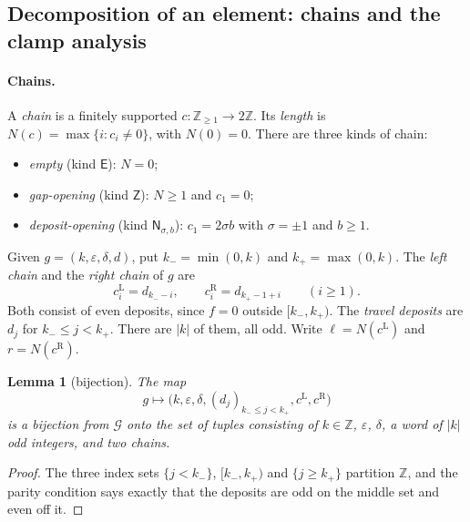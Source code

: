 \documentclass[11pt]{article}
\theoremstyle{plain}
\newtheorem{lemma}[theorem]{Lemma}
\theoremstyle{definition}
\theoremstyle{remark}
\begin{document}
\subsection{Decomposition of an element: chains and the clamp analysis}\label{app:decomp}

\paragraph{Chains.}
A \emph{chain} is a finitely supported $c:\mathbb Z_{\ge1}\to2\mathbb Z$. Its \emph{length}
is $N(c)=\max\{i:c_i\ne0\}$, with $N(0)=0$. There are three kinds of chain:
\begin{itemize}
\item \emph{empty} (kind $\mathsf E$): $N=0$;
\item \emph{gap-opening} (kind $\mathsf Z$): $N\ge1$ and $c_1=0$;
\item \emph{deposit-opening} (kind $\mathsf N_{\sigma,b}$): $c_1=2\sigma b$ with $\sigma=\pm1$ and $b\ge1$.
\end{itemize}

Given $g=(k,\varepsilon,\delta,d)$, put $k_-=\min(0,k)$ and $k_+=\max(0,k)$. The
\emph{left chain} and the \emph{right chain} of $g$ are
\[
  c^{\mathrm L}_i=d_{k_--i},\qquad c^{\mathrm R}_i=d_{k_+-1+i}\qquad(i\ge1).
\]
Both consist of even deposits, since $f=0$ outside $[k_-,k_+)$. The \emph{travel deposits}
are $d_j$ for $k_-\le j<k_+$. There are $|k|$ of them, all odd. Write $\ell=N(c^{\mathrm L})$
and $r=N(c^{\mathrm R})$.

\begin{lemma}[bijection]\label{M3:lem:bij}
The map
\[
  g\mapsto\bigl(k,\varepsilon,\delta,(d_j)_{k_-\le j<k_+},c^{\mathrm L},c^{\mathrm R}\bigr)
\]
is a bijection from $\mathcal G$ onto the set of tuples consisting of $k\in\mathbb Z$,
$\varepsilon$, $\delta$, a word of $|k|$ odd integers, and two chains.
\end{lemma}

\begin{proof}
The three index sets $\{j<k_-\}$, $[k_-,k_+)$ and $\{j\ge k_+\}$ partition $\mathbb Z$, and
the parity condition says exactly that the deposits are odd on the middle set and even off
it.
\end{proof}
\end{document}
